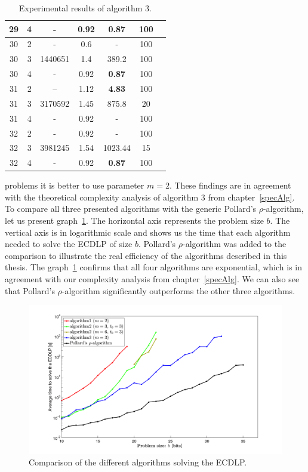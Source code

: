 \documentclass[thesis=M,english]{FITthesis}[2012/10/20]
\theoremstyle{remark}
\theoremstyle{definition}
\begin{document}
\begin{table}[H]
\begin{tabular}{ |c||c|c|c|c|c|c| }
29 & 4 & - & 0.92 & \textbf{0.87} & 100 \\ \hline \hline
30 & 2 & - & 0.6 & -& 100 \\ \hline 
30 & 3 & 1440651 & 1.4 & 389.2 & 100 \\ \hline 
30 & 4 & - & 0.92 & \textbf{0.87} & 100 \\ \hline \hline
31 & 2 & -- & 1.12 & \textbf{4.83} & 100 \\ \hline 
31 & 3 & 3170592 & 1.45 & 875.8 & 20 \\ \hline 
31 & 4 &- & 0.92 & -& 100 \\ \hline \hline
32 & 2 & - & 0.92 & - & 100 \\ \hline 
32 & 3 & 3981245 & 1.54 & 1023.44 & 15 \\ \hline 
32 & 4 & - & 0.92 & \textbf{0.87} & 100 \\ \hline 
\end{tabular}
\caption[Experimental results of algorithm 3]{Experimental results of algorithm 3.}
\label{mcg3}
\end{table}
\noindent problems it is better to use parameter $m=2$. These findings are in agreement with the theoretical complexity analysis of algorithm 3 from chapter~\ref{specAlg}.
To compare all three presented algorithms with the generic Pollard's $\rho$-algorithm, let us present graph~\ref{grph1}. The horizontal axis represents the problem size $b$. The vertical axis is in logarithmic scale and shows us the time that each algorithm needed to solve the ECDLP of size $b$. Pollard's $\rho$-algorithm was added to the comparison to illustrate the real efficiency of the algorithms described in this thesis. The graph~\ref{grph1} confirms that all four algorithms are exponential, which is in agreement with our complexity analysis from chapter~\ref{specAlg}. We can also see that Pollard's $\rho$-algorithm significantly outperforms the other three algorithms.
 \begin{figure}[h]
 \centering
 \hspace*{-2.5cm}
 	\includegraphics[width=1.42\textwidth]{algCompar.png}
 	\caption[Comparison of the different algorithms solving the ECDLP]{Comparison of the different algorithms solving the ECDLP.}
 	\label{grph1}
 \end{figure}
\end{document}
